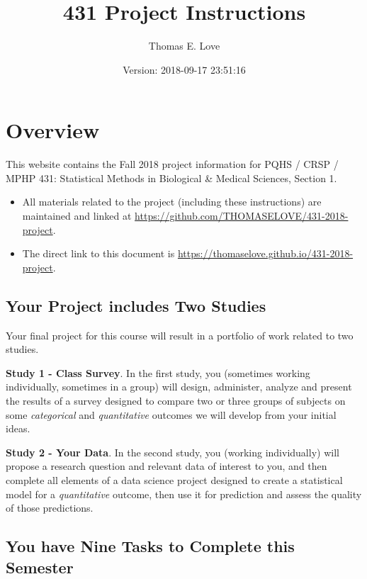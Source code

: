 \documentclass[]{book}
\title{431 Project Instructions}
\author{Thomas E. Love}
\date{Version: 2018-09-17 23:51:16}
\providecommand{\tightlist}{%
  \setlength{\itemsep}{0pt}\setlength{\parskip}{0pt}}
\theoremstyle{definition}
\theoremstyle{definition}
\theoremstyle{definition}
\theoremstyle{remark}
\begin{document}
\maketitle

{
\setcounter{tocdepth}{1}
\tableofcontents
}
\hypertarget{overview}{%
\chapter*{Overview}\label{overview}}

This website contains the Fall 2018 project information for PQHS / CRSP
/ MPHP 431: Statistical Methods in Biological \& Medical Sciences,
Section 1.

\begin{itemize}
\tightlist
\item
  All materials related to the project (including these instructions)
  are maintained and linked at
  \url{https://github.com/THOMASELOVE/431-2018-project}.
\item
  The direct link to this document is
  \url{https://thomaselove.github.io/431-2018-project}.
\end{itemize}

\hypertarget{your-project-includes-two-studies}{%
\section*{Your Project includes Two
Studies}\label{your-project-includes-two-studies}}

Your final project for this course will result in a portfolio of work
related to two studies.

\textbf{Study 1 - Class Survey}. In the first study, you (sometimes
working individually, sometimes in a group) will design, administer,
analyze and present the results of a survey designed to compare two or
three groups of subjects on some \emph{categorical} and
\emph{quantitative} outcomes we will develop from your initial ideas.

\textbf{Study 2 - Your Data}. In the second study, you (working
individually) will propose a research question and relevant data of
interest to you, and then complete all elements of a data science
project designed to create a statistical model for a \emph{quantitative}
outcome, then use it for prediction and assess the quality of those
predictions.

\hypertarget{you-have-nine-tasks-to-complete-this-semester}{%
\section*{You have Nine Tasks to Complete this
Semester}\label{you-have-nine-tasks-to-complete-this-semester}}
\end{document}
